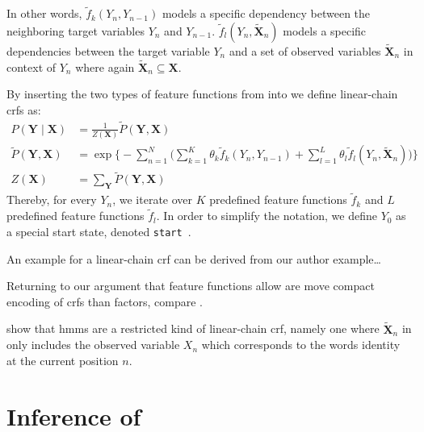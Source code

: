 In other words, $\tilde{f}_k(Y_n,Y_{n-1})$ models a specific dependency between the neighboring \glspl{target variable} $Y_n$ and $Y_{n-1}$. $\tilde{f}_l(Y_n,\bm{\tilde{X}}_n)$ models a specific dependencies between the \gls{target variable} $Y_n$ and a set of \glspl{observed variable} $\bm{\tilde{X}}_n$ in context of $Y_n$ where again $\bm{\tilde{X}}_n\subseteq\bm{X}$.

By inserting the two types of \glspl{feature function} from  into  we define \glspl{linear-chain crf} as:
\begin{equation}
  \label{equ:linear-chain-crf-log-linear}
  \begin{split}
    P(\bm{Y}\mid\bm{X}) & = \frac{1}{Z(\bm{X})}\tilde{P}(\bm{Y},\bm{X})  \\
    \tilde{P}(\bm{Y},\bm{X}) & = \exp\Bigg\{ -\sum_{n=1}^N \Big(\sum_{k=1}^K\theta_k \tilde{f}_k(Y_n,Y_{n-1})+\sum_{l=1}^L\theta_l \tilde{f}_l(Y_n,\bm{\tilde{X}}_n)\Big) \Bigg\} \\
    Z(\bm{X}) & = \sum_{\bm{Y}}\tilde{P}(\bm{Y},\bm{X})
  \end{split}
\end{equation}
Thereby, for every $Y_n$, we iterate over $K$ predefined \glspl{feature function} $\tilde{f}_k$ and $L$ predefined \glspl{feature function} $\tilde{f}_l$.
In order to simplify the notation, we define $Y_0$ as a special start state, denoted \texttt{start}~\citep{lafferty2001conditional}.

An example for a  \gls{linear-chain crf} can be derived from our author example\dots{}

Returning to our argument that \glspl{feature function} allow are move compact encoding of \glspl{crf} than \glspl{factor}, compare .

\citet{sutton2010introduction} show that \glspl{hmm} are a restricted kind of \gls{linear-chain crf}, namely one where $\bm{\tilde{X}}_n$ in  only includes the \gls{observed variable} $X_n$ which corresponds to the words identity at the current position $n$.

\section{Inference of }\label{sec:inference-crfs}

